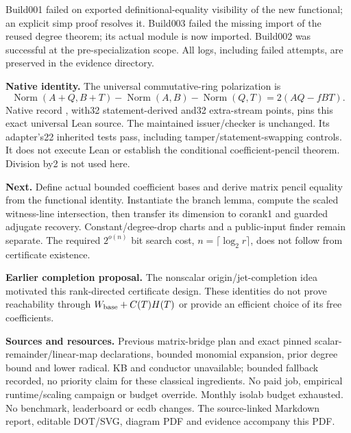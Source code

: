 \documentclass[11pt]{article}
\begin{document}
Build001 failed on exported definitional-equality visibility of the new
functional; an explicit simp proof resolves it. Build003 failed the missing
import of the reused degree theorem; its actual module is now imported.
Build002 was successful at the pre-specialization scope. All logs, including
failed attempts, are preserved in the evidence directory.

\textbf{Native identity.} The universal commutative-ring polarization is
\[
 \operatorname{Norm}(A+Q,B+T)-\operatorname{Norm}(A,B)
 -\operatorname{Norm}(Q,T)=2(AQ-fBT).
\]
Native record , with32 statement-derived and32
extra-stream points, pins this exact universal Lean source. The maintained
issuer/checker is unchanged. Its adapter's22 inherited tests pass, including
tamper/statement-swapping controls. It does not execute Lean or establish the
conditional coefficient-pencil theorem. Division by2 is not used here.

\textbf{Next.} Define actual bounded coefficient bases and derive matrix
pencil equality from the functional identity. Instantiate the branch lemma,
compute the scaled witness-line intersection, then transfer its dimension to
corank1 and guarded adjugate recovery. Constant/degree-drop charts and a
public-input finder remain separate. The required $2^{o(n)}$ bit search cost,
$n=\lceil\log_2r\rceil$, does not follow from certificate existence.

\textbf{Earlier completion proposal.} The nonscalar origin/jet-completion
idea motivated this rank-directed certificate design. These identities do not
prove reachability through $W_{\rm base}+C(T)H(T)$ or provide an efficient
choice of its free coefficients.

\textbf{Sources and resources.} Previous matrix-bridge plan and exact pinned
 scalar-remainder/linear-map declarations,
 bounded monomial expansion, prior degree bound and
lower radical. KB and conductor unavailable; bounded fallback recorded, no
priority claim for these classical ingredients. No paid job, empirical
runtime/scaling campaign or budget override. Monthly isolab budget exhausted.
No benchmark, leaderboard or ecdb changes. The source-linked Markdown report,
editable DOT/SVG, diagram PDF and evidence accompany this PDF.
\end{document}
